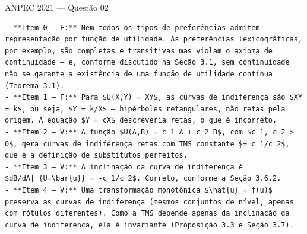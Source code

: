 \documentclass[11pt,twoside,openright]{book}
\begin{document}
\begin{infobox}{ANPEC 2021 — Questão 02}
\begin{verbatim}
- **Item 0 — F:** Nem todos os tipos de preferências admitem representação por função de utilidade. As preferências lexicográficas, por exemplo, são completas e transitivas mas violam o axioma de continuidade — e, conforme discutido na Seção 3.1, sem continuidade não se garante a existência de uma função de utilidade contínua (Teorema 3.1).
- **Item 1 — F:** Para $U(X,Y) = XY$, as curvas de indiferença são $XY = k$, ou seja, $Y = k/X$ — hipérboles retangulares, não retas pela origem. A equação $Y = cX$ descreveria retas, o que é incorreto.
- **Item 2 — V:** A função $U(A,B) = c_1 A + c_2 B$, com $c_1, c_2 > 0$, gera curvas de indiferença retas com TMS constante $= c_1/c_2$, que é a definição de substitutos perfeitos.
- **Item 3 — V:** A inclinação da curva de indiferença é $dB/dA|_{U=\bar{u}} = -c_1/c_2$. Correto, conforme a Seção 3.6.2.
- **Item 4 — V:** Uma transformação monotônica $\hat{u} = f(u)$ preserva as curvas de indiferença (mesmos conjuntos de nível, apenas com rótulos diferentes). Como a TMS depende apenas da inclinação da curva de indiferença, ela é invariante (Proposição 3.3 e Seção 3.7).
\end{verbatim}

\end{infobox}
\end{document}
